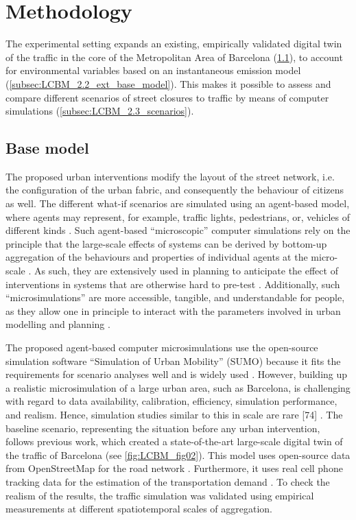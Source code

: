 \section{Methodology}
\label{sec:LCBM_2_method}
The experimental setting expands an existing, empirically validated digital twin of the traffic in the core of the Metropolitan Area of Barcelona (\cref{subsec:LCBM_2.1_base_model}), to account for environmental variables based on an instantaneous emission model (\cref{subsec:LCBM_2.2_ext_base_model}). This makes it possible to assess and compare different scenarios of street closures to traffic by means of computer simulations (\cref{subsec:LCBM_2.3_scenarios}).

\subsection{Base model}
\label{subsec:LCBM_2.1_base_model}

The proposed urban interventions modify the layout of the street network, i.e. the configuration of the urban fabric, and consequently the behaviour of citizens as well. The different what-if scenarios \citep{Rizzi2009} are simulated using an agent-based model, where agents may represent, for example, traffic lights, pedestrians, or, vehicles of different kinds \citep{Lammer2008,Nagel2000}. Such agent-based “microscopic” computer simulations rely on the principle that the large-scale effects of systems can be derived by bottom-up aggregation of the behaviours and properties of individual agents at the micro-scale \citep{Helbing2010,Saidallah2016}. As such,  they are extensively used in planning to anticipate the effect of interventions in systems that are otherwise hard to pre-test \citep{Vinitsky2018,Law2019}. Additionally, such “microsimulations” are more accessible, tangible, and understandable for people, as they allow one in principle to interact with the parameters involved in urban modelling and planning \citep{Priebe2019}.

The proposed agent-based computer microsimulations use the open-source simulation software “Simulation of Urban Mobility” (SUMO) because it fits the requirements for scenario analyses well and is widely used \citep{Lopez2018,Urquiza-Aguiar2020,Diallo2021}. However, building up a realistic microsimulation of a large urban area, such as Barcelona, is challenging with regard to data availability, calibration, efficiency, simulation performance, and realism. Hence, simulation studies similar to this in scale are rare [74] \citep{ArgotaSanchez-Vaquerizo2021}. The baseline scenario, representing the situation before any urban intervention, follows previous work, which created a state-of-the-art large-scale digital twin of the traffic of Barcelona (see \cref{fig:LCBM_fig02}). This model uses open-source data from OpenStreetMap for the road network \citep{OpenStreetMap,Boeing2017}. Furthermore, it uses real cell phone tracking data for the estimation of the transportation demand \citep{Calvet2020}. To check the realism of the results, the traffic simulation was validated using empirical measurements at different spatiotemporal scales of aggregation.

